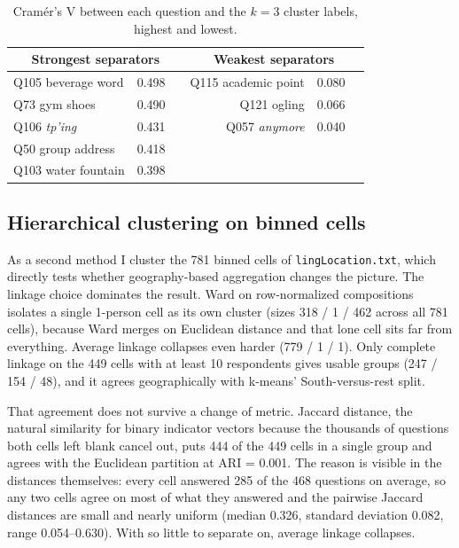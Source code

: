 \documentclass[10pt,letterpaper]{article}
\begin{document}
\begin{table}[h]
\centering
\begin{tabular}{lrlrlr}
\hline
\multicolumn{3}{c}{Strongest separators} & \multicolumn{3}{c}{Weakest separators} \\
\hline
Q105 beverage word & 0.498 & & Q115 academic point & 0.080 & \\
Q73 gym shoes & 0.490 & & Q121 ogling & 0.066 & \\
Q106 \emph{tp'ing} & 0.431 & & Q057 \emph{anymore} & 0.040 & \\
Q50 group address & 0.418 & & & & \\
Q103 water fountain & 0.398 & & & & \\
\hline
\end{tabular}
\caption{Cram\'er's V between each question and the $k=3$ cluster labels,
highest and lowest.}
\label{tab:separators}
\end{table}

\subsection{Hierarchical clustering on binned cells}

As a second method I cluster the 781 binned cells of
\texttt{lingLocation.txt}, which directly tests whether geography-based
aggregation changes the picture. The linkage choice dominates the result.
Ward on row-normalized compositions isolates a single 1-person cell as its own
cluster (sizes 318 / 1 / 462 across all 781 cells), because Ward merges on
Euclidean distance and that lone cell sits far from everything. Average linkage
collapses even harder (779 / 1 / 1). Only complete linkage on the 449 cells
with at least 10 respondents gives usable groups (247 / 154 / 48), and it
agrees geographically with k-means' South-versus-rest split.

That agreement does not survive a change of metric. Jaccard distance, the
natural similarity for binary indicator vectors because the thousands of
questions both cells left blank cancel out, puts 444 of the 449 cells in a
single group and agrees with the Euclidean partition at ARI = 0.001. The reason
is visible in the distances themselves: every cell answered 285 of the 468
questions on average, so any two cells agree on most of what they answered and
the pairwise Jaccard distances are small and nearly uniform (median 0.326,
standard deviation 0.082, range 0.054--0.630). With so little to separate on,
average linkage collapses.
\end{document}
